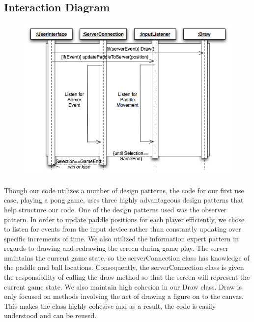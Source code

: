 \documentclass[12pt]{article}
\begin{document}
\subsection{Interaction Diagram}
\begin{figure}
\begin{center}
\includegraphics[scale=.7]{InteractionDiagram.png}
\caption{\label{InteractionDiagram}}
\end{center}
\end{figure}
Though our code utilizes a number of design patterns, the code for our first use case, playing a pong
game, uses three highly advantageous design patterns that help structure our code.
One of the design patterns used was the observer pattern.  In order to update paddle positions for each
player efficiently, we chose to listen for events from the input device rather than constantly updating
over specific increments of time.  We also utilized the information expert pattern in regards to drawing
and redrawing the screen during game play.  The server maintains the current game state, so the
serverConnection class has knowledge of the paddle and ball locations.  Consequently, the serverConnection
class is given the responsibility of calling the draw method so that the screen will represent the
current game state.  We also maintain high cohesion in our Draw class.  Draw is only focused on methods
involving the act of drawing a figure on to the canvas.  This makes the class highly cohesive and as a
result, the code is easily understood and can be reused.
\end{document}

